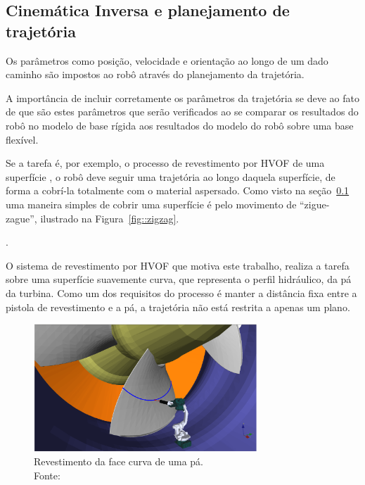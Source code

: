 \subsection{Cinemática Inversa e planejamento de
trajetória}\label{sec::ikin_traj}



Os parâmetros como posição, velocidade e orientação ao longo de um dado caminho
são impostos ao robô através do planejamento da trajetória.


A importância de incluir corretamente os parâmetros da trajetória se
deve ao fato de que são estes parâmetros que serão verificados ao se comparar
os resultados do robô no modelo de base rígida aos resultados do modelo do robô
sobre uma base flexível. 

Se a tarefa é, por exemplo, o processo de revestimento por HVOF de uma
superfície , o robô deve seguir uma trajetória ao longo daquela superfície, de
forma a cobrí-la totalmente com o material aspersado. Como visto na
seção~\ref{sec::ikin_traj} uma maneira simples de cobrir uma superfície é pelo
movimento de ``zigue-zague'', ilustrado
na Figura~\ref{fig::zigzag}.

.

O sistema de revestimento por HVOF que motiva este trabalho, realiza a tarefa
sobre uma superfície suavemente curva, que representa o perfil hidráulico, da pá
da turbina. Como um dos requisitos do processo é manter a distância fixa entre a
pistola de revestimento e a pá, a trajetória não está restrita a apenas um
plano.

\begin{figure}[h]
	\centering 
 	\includegraphics[width=0.75\textwidth]{figs/coat_blade}
 	\caption[Revestimento da face curva de uma pá]{Revestimento da face curva de
 	uma pá. \\Fonte: \citet{8206216}}
 	\label{fig::trajec_600x30}
\end{figure}

